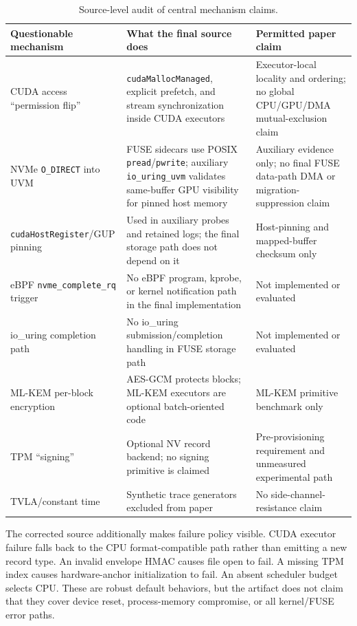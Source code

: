 \begin{table}[t]
\centering
\caption{Source-level audit of central mechanism claims.}
\small
\setlength{\tabcolsep}{3pt}
\begin{tabularx}{\textwidth}{P{0.22\textwidth}|P{0.28\textwidth}|Y}
\toprule
\textbf{Questionable mechanism} & \textbf{What the final source does} & \textbf{Permitted paper claim}\\
\midrule
CUDA access ``permission flip'' & \texttt{cudaMallocManaged}, explicit prefetch, and stream synchronization inside CUDA executors & Executor-local locality and ordering; no global CPU/GPU/DMA mutual-exclusion claim\\
NVMe \texttt{O\_DIRECT} into UVM & FUSE sidecars use POSIX \texttt{pread}/\texttt{pwrite}; auxiliary \texttt{io\_uring\_uvm} validates same-buffer GPU visibility for pinned host memory & Auxiliary evidence only; no final FUSE data-path DMA or migration-suppression claim\\
\texttt{cudaHostRegister}/GUP pinning & Used in auxiliary probes and retained logs; the final storage path does not depend on it & Host-pinning and mapped-buffer checksum only\\
eBPF \texttt{nvme\_complete\_rq} trigger & No eBPF program, kprobe, or kernel notification path in the final implementation & Not implemented or evaluated\\
io\_uring completion path & No io\_uring submission/completion handling in FUSE storage path & Not implemented or evaluated\\
ML-KEM per-block encryption & AES-GCM protects blocks; ML-KEM executors are optional batch-oriented code & ML-KEM primitive benchmark only\\
TPM ``signing'' & Optional NV record backend; no signing primitive is claimed & Pre-provisioning requirement and unmeasured experimental path\\
TVLA/constant time & Synthetic trace generators excluded from paper & No side-channel-resistance claim\\
\bottomrule
\end{tabularx}
\label{tab:api_audit}
\end{table}

The corrected source additionally makes failure policy visible.  CUDA executor
failure falls back to the CPU format-compatible path rather than emitting a
new record type.  An invalid envelope HMAC causes file open to fail.  A missing
TPM index causes hardware-anchor initialization to fail.  An absent scheduler
budget selects CPU.  These are robust default behaviors, but the artifact does
not claim that they cover device reset, process-memory compromise, or all
kernel/FUSE error paths.

